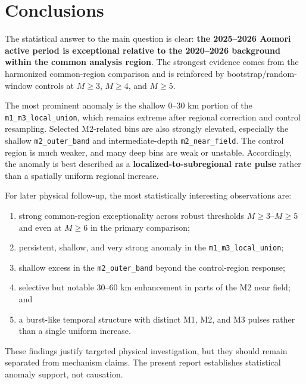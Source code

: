 \documentclass[11pt]{article}
\begin{document}
\section{Conclusions}
The statistical answer to the main question is clear: \textbf{the 2025--2026 Aomori active period is exceptional relative to the 2020--2026 background within the common analysis region}. The strongest evidence comes from the harmonized common-region comparison and is reinforced by bootstrap/random-window controls at $M\geq 3$, $M\geq 4$, and $M\geq 5$.

The most prominent anomaly is the shallow 0--30 km portion of the \texttt{m1\_m3\_local\_union}, which remains extreme after regional correction and control resampling. Selected M2-related bins are also strongly elevated, especially the shallow \texttt{m2\_outer\_band} and intermediate-depth \texttt{m2\_near\_field}. The control region is much weaker, and many deep bins are weak or unstable. Accordingly, the anomaly is best described as a \textbf{localized-to-subregional rate pulse} rather than a spatially uniform regional increase.

For later physical follow-up, the most statistically interesting observations are:
\begin{enumerate}[leftmargin=1.5em]
    \item strong common-region exceptionality across robust thresholds $M\geq 3$--$M\geq 5$ and even at $M\geq 6$ in the primary comparison;
    \item persistent, shallow, and very strong anomaly in the \texttt{m1\_m3\_local\_union};
    \item shallow excess in the \texttt{m2\_outer\_band} beyond the control-region response;
    \item selective but notable 30--60 km enhancement in parts of the M2 near field; and
    \item a burst-like temporal structure with distinct M1, M2, and M3 pulses rather than a single uniform increase.
\end{enumerate}
These findings justify targeted physical investigation, but they should remain separated from mechanism claims. The present report establishes statistical anomaly support, not causation.
\end{document}
